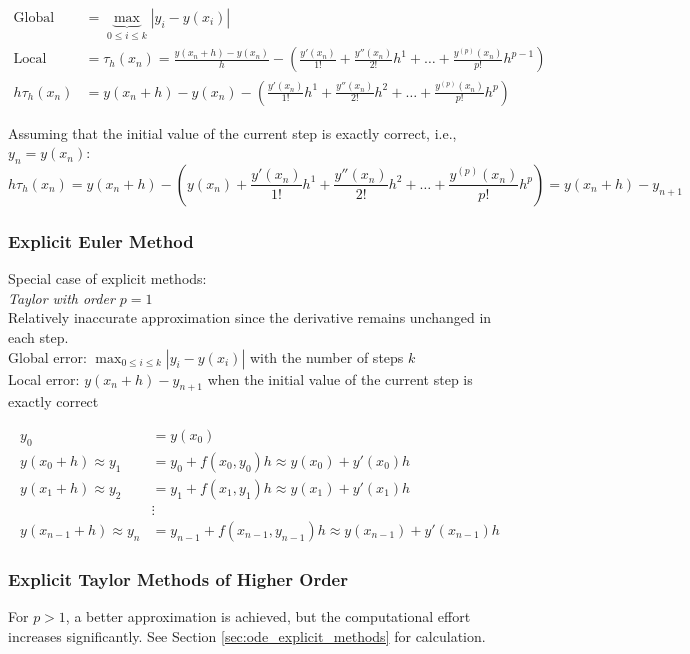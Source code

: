 \begin{align*}
\text{Global error} &= \underbrace{\max}_{0 \leq i \leq k} |y_i - y(x_i)| \\
\text{Local error (slope)} &= \tau_h(x_n) = \frac{y(x_n +h)- y(x_n)}{h} - \left( \frac{y'(x_n)}{1!} + \frac{y''(x_n)}{2!}h^1 + \dots + \frac{y^{(p)} (x_n)}{p!} h^{p-1} \right) \\
h \tau_h(x_n) &= y(x_n +h)- y(x_n) - \left( \frac{y'(x_n)}{1!}h^1 + \frac{y''(x_n)}{2!}h^2 + \dots + \frac{y^{(p)} (x_n)}{p!} h^{p} \right)
\end{align*}

Assuming that the initial value of the current step is exactly correct, i.e., $y_n = y(x_n)$:
$$h \tau_h(x_n) = y(x_n +h) - \left(y(x_n) + \frac{y'(x_n)}{1!}h^1 + \frac{y''(x_n)}{2!}h^2 + \dots + \frac{y^{(p)} (x_n)}{p!} h^{p} \right) = y(x_n + h)-y_{n+1}$$

\begin{minipage}{7cm}
  \subsubsection{Explicit Euler Method}
    Special case of explicit methods: \\
    \emph{Taylor with order $p=1$} \\
    Relatively inaccurate approximation since the derivative remains unchanged in each step.  \\

    Global error: $\max_{0 \leq i \leq k} |y_i - y(x_i)|$ with the number of steps $k$\\
    Local error: $y(x_n+h) - y_{n+1}$ when the initial value of the current step is exactly correct
\end{minipage}
\hspace{8mm}
\begin{minipage}{12cm}
    \begin{align*}
        y_0 &= y(x_0) \\
        y(x_0+h) \approx y_1 &= y_0 + f(x_0,y_0) h \approx y(x_0) + y'(x_0)h \\
        y(x_1+h) \approx y_2 &= y_1 + f(x_1,y_1)h \approx y(x_1) + y'(x_1)h \\
        & \vdots \\
        y(x_{n-1}+h) \approx y_n &= y_{n-1} + f(x_{n-1},y_{n-1})h \approx y(x_{n-1}) + y'(x_{n-1})h
    \end{align*}
\end{minipage}

\subsubsection{Explicit Taylor Methods of Higher Order}
  For $p > 1$, a better approximation is achieved, but the computational effort increases significantly.
  See Section \ref{sec:ode_explicit_methods} for calculation.

